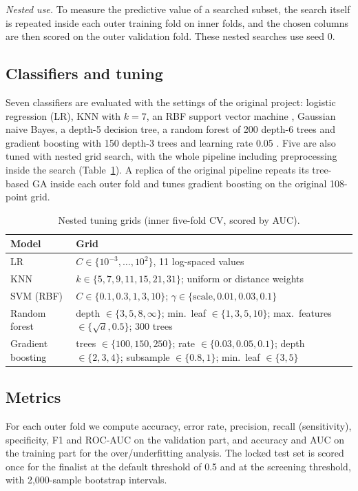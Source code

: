 \documentclass[conference]{IEEEtran}
\begin{document}
\textit{Nested use.} To measure the predictive value of a searched subset, the search itself is repeated inside each outer training fold on inner folds, and the chosen columns are then scored on the outer validation fold. These nested searches use seed 0.

\subsection{Classifiers and tuning}
Seven classifiers are evaluated with the settings of the original project: logistic regression (LR), KNN with $k=7$, an RBF support vector machine \cite{cortes1995}, Gaussian naive Bayes, a depth-5 decision tree, a random forest of 200 depth-6 trees \cite{breiman2001} and gradient boosting with 150 depth-3 trees and learning rate 0.05 \cite{friedman2001}. Five are also tuned with nested grid search, with the whole pipeline including preprocessing inside the search (Table~\ref{tab:grids}). A replica of the original pipeline repeats its tree-based GA inside each outer fold and tunes gradient boosting on the original 108-point grid.

\begin{table}[!tb]
\centering
\caption{Nested tuning grids (inner five-fold CV, scored by AUC).}
\label{tab:grids}
\footnotesize
\begin{tabularx}{\columnwidth}{@{}lX@{}}
\toprule
Model & Grid \\
\midrule
LR & $C\in\{10^{-3},\dots,10^{2}\}$, 11 log-spaced values \\
KNN & $k\in\{5,7,9,11,15,21,31\}$; uniform or distance weights \\
SVM (RBF) & $C\in\{0.1,0.3,1,3,10\}$; $\gamma\in\{\text{scale},0.01,0.03,0.1\}$ \\
Random forest & depth $\in\{3,5,8,\infty\}$; min.\ leaf $\in\{1,3,5,10\}$; max.\ features $\in\{\sqrt{d},0.5\}$; 300 trees \\
Gradient boosting & trees $\in\{100,150,250\}$; rate $\in\{0.03,0.05,0.1\}$; depth $\in\{2,3,4\}$; subsample $\in\{0.8,1\}$; min.\ leaf $\in\{3,5\}$ \\
\bottomrule
\end{tabularx}
\end{table}

\subsection{Metrics}
For each outer fold we compute accuracy, error rate, precision, recall (sensitivity), specificity, F1 and ROC-AUC on the validation part, and accuracy and AUC on the training part for the over/underfitting analysis. The locked test set is scored once for the finalist at the default threshold of 0.5 and at the screening threshold, with 2,000-sample bootstrap intervals.
\end{document}
